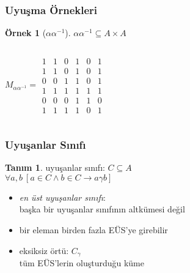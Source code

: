 \documentclass[dvipsnames]{beamer}
\theoremstyle{definition}
\newtheorem{tanim}[theorem]{Tanım}
\theoremstyle{example}
\newtheorem{ornek}[theorem]{Örnek}
\theoremstyle{plain}
\begin{document}
\begin{frame}
  \frametitle{Uyuşma Örnekleri}

  \begin{ornek}[$\alpha \alpha^{-1}$]
    $\alpha \alpha^{-1} \subseteq A \times A$

    \begin{columns}
      \[ M_{\alpha \alpha^{-1}}= \begin{array}{|cccccc|}
          1  &  1  &  0  &  1  &  0  &  1\\
          1  &  1  &  0  &  1  &  0  &  1\\
          0  &  0  &  1  &  1  &  0  &  1\\
          1  &  1  &  1  &  1  &  1  &  1\\
          0  &  0  &  0  &  1  &  1  &  0\\
          1  &  1  &  1  &  1  &  0  &  1
        \end{array} \]

      \begin{center}
      \end{center}
    \end{columns}
  \end{ornek}
\end{frame}

\begin{frame}
  \frametitle{Uyuşanlar Sınıfı}

  \begin{tanim}
    \alert{uyuşanlar sınıfı}: $C \subseteq A$\\
      $\forall a,b~[a \in C \wedge b \in C \rightarrow a \gamma b]$
  \end{tanim}

  \pause
  \medskip
  \begin{itemize}
    \item \emph{en üst uyuşanlar sınıfı}:\\
      başka bir uyuşanlar sınıfının altkümesi değil

    \pause
    \item bir eleman birden fazla EÜS'ye girebilir

    \pause
    \medskip
    \item \alert{eksiksiz örtü}: $C_\gamma$\\
      tüm EÜS'lerin oluşturduğu küme
  \end{itemize}
\end{frame}
\end{document}
